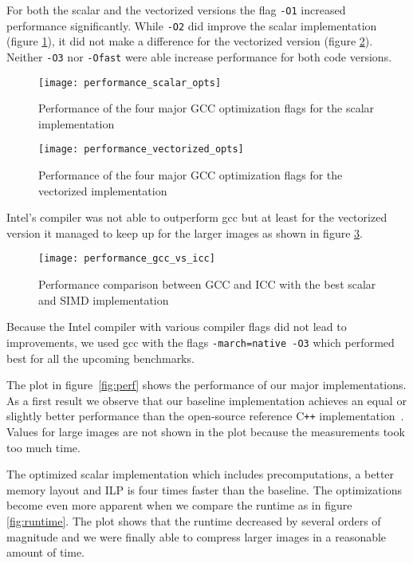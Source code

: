 For both the scalar and the vectorized versions the flag \texttt{-O1} increased
performance significantly. While \texttt{-O2} did improve the scalar
implementation (figure \ref{fig:perf_scal}), it did not make a difference for
the vectorized version (figure \ref{fig:perf_vec}). Neither \texttt{-O3} nor
\texttt{-Ofast} were able increase performance for both code versions.

\begin{figure}[H]
  \centering
  \texttt{[image: performance\_scalar\_opts]}
  \caption{Performance of the four major GCC optimization flags for the scalar implementation}
  \label{fig:perf_scal}
\end{figure}

\begin{figure}[H]
    \centering
    \texttt{[image: performance\_vectorized\_opts]}
    \caption{Performance of the four major GCC optimization flags for the vectorized implementation}
    \label{fig:perf_vec}
  \end{figure}

Intel's compiler was not able to outperform gcc but at least for the vectorized
version it managed to keep up for the larger images as shown in figure
\ref{fig:perf_gcc_vs_icc}.

\begin{figure}[H]
  \centering
  \texttt{[image: performance\_gcc\_vs\_icc]}
  \caption{Performance comparison between GCC and ICC with the best scalar and
    SIMD implementation}
  \label{fig:perf_gcc_vs_icc}
\end{figure}

Because the Intel compiler with various compiler flags did not lead to
improvements, we used gcc with the flags \texttt{-march=native -O3} which
performed best for all the upcoming benchmarks.

 The plot in figure~\ref{fig:perf} shows the performance of
our major implementations. As a first result we observe that our baseline
implementation achieves an equal or slightly better performance than the
open-source reference C\texttt{++} implementation~\cite{github-cpp}. Values for
large images are not shown in the plot because the measurements took too much
time.

The optimized scalar implementation which includes precomputations, a better
memory layout and ILP is four times faster than the baseline. The optimizations
become even more apparent when we compare the runtime as in figure
\ref{fig:runtime}. The plot shows that the runtime decreased by several orders
of magnitude and we were finally able to compress larger images in a reasonable
amount of time.

